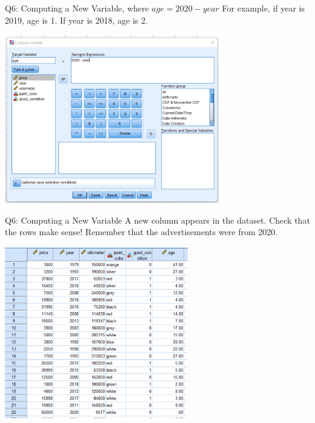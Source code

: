 \documentclass[11pt]{beamer}
\begin{document}
\begin{frame}{Q6: Computing a New Variable, where $age=2020-year$}
  For example, if year is 2019, age is 1. If year is 2018, age is 2.
  \begin{center}
    \includegraphics[width=0.7\textwidth]{f150-compute-age.png}
  \end{center}
\end{frame}

\begin{frame}{Q6: Computing a New Variable}
  A new column appears in the dataset. Check that the rows make sense! Remember that the advertisements were from 2020.
  \begin{center}
    \includegraphics[width=0.6\textwidth]{f150-new-age-column.png}
  \end{center}
\end{frame}
\end{document}
